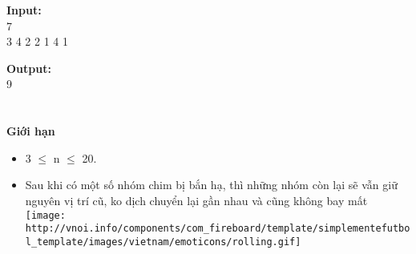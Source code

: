 \textbf{Input:}
\\7
\\3 4 2 2 1 4 1

\textbf{Output:}
\\9
\\
\\
\\\textbf{Giới hạn}
\begin{itemize}
	\item 3  $\le$  n  $\le$  20.
	\item Sau khi có một số nhóm chim bị bắn hạ, thì những nhóm còn lại sẽ vẫn giữ nguyên vị trí cũ, ko dịch chuyển lại gần nhau và cũng không bay mất 
\texttt{[image: http://vnoi.info/components/com\_fireboard/template/simplementefutbol\_template/images/vietnam/emoticons/rolling.gif]}
\end{itemize}